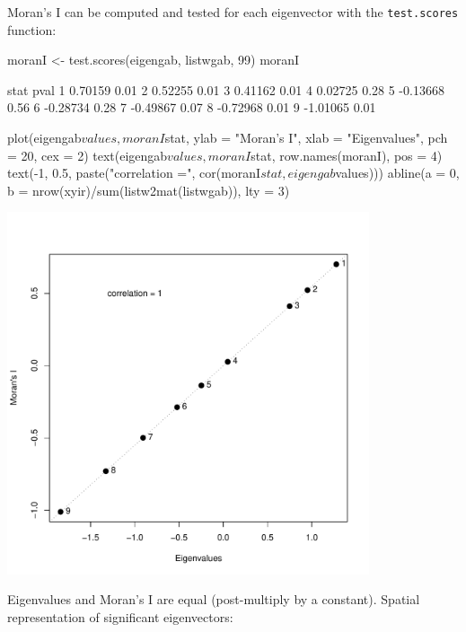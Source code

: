 \documentclass[a4paper]{article}
\begin{document}
Moran's I can be computed and tested for each eigenvector with the \texttt{test.scores} function:
\begin{Schunk}
\begin{Sinput}
 moranI <- test.scores(eigengab, listwgab, 99)
 moranI
\end{Sinput}
\begin{Soutput}
      stat pval
1  0.70159 0.01
2  0.52255 0.01
3  0.41162 0.01
4  0.02725 0.28
5 -0.13668 0.56
6 -0.28734 0.28
7 -0.49867 0.07
8 -0.72968 0.01
9 -1.01065 0.01
\end{Soutput}
\end{Schunk}
\begin{Schunk}
\begin{Sinput}
 plot(eigengab$values, moranI$stat, ylab = "Moran's I", 
     xlab = "Eigenvalues", pch = 20, cex = 2)
 text(eigengab$values, moranI$stat, row.names(moranI), 
     pos = 4)
 text(-1, 0.5, paste("correlation =", cor(moranI$stat, 
     eigengab$values)))
 abline(a = 0, b = nrow(xyir)/sum(listw2mat(listwgab)), 
     lty = 3)
\end{Sinput}
\end{Schunk}
\begin{center}
\includegraphics[width=0.8\textwidth,keepaspectratio]{figs/tutorial-ni25c}
\end{center}

Eigenvalues and Moran's I are equal (post-multiply by a constant). Spatial representation of significant eigenvectors:
\end{document}
